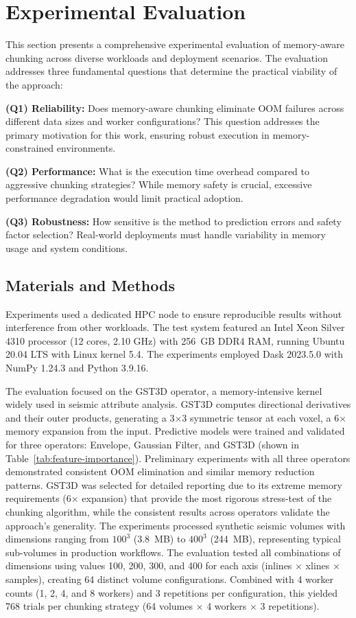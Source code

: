 \section{Experimental Evaluation}
\label{sec:experimental-results}

This section presents a comprehensive experimental evaluation of memory-aware chunking across diverse workloads and deployment scenarios.
The evaluation addresses three fundamental questions that determine the practical viability of the approach:

\textbf{(Q1) Reliability:} Does memory-aware chunking eliminate \ac{OOM} failures across different data sizes and worker configurations?
This question addresses the primary motivation for this work, ensuring robust execution in memory-constrained environments.

\textbf{(Q2) Performance:} What is the execution time overhead compared to aggressive chunking strategies?
While memory safety is crucial, excessive performance degradation would limit practical adoption.

\textbf{(Q3) Robustness:} How sensitive is the method to prediction errors and safety factor selection?
Real-world deployments must handle variability in memory usage and system conditions.

\subsection{Materials and Methods}

Experiments used a dedicated \ac{HPC} node to ensure reproducible results without interference from other workloads.
The test system featured an Intel Xeon Silver 4310 processor (12 cores, 2.10 GHz) with 256~\ac{GB} DDR4 \ac{RAM}, running Ubuntu 20.04 LTS with Linux kernel 5.4.
The experiments employed Dask 2023.5.0 with NumPy 1.24.3 and Python 3.9.16.

The evaluation focused on the \ac{GST3D} operator, a memory-intensive kernel widely used in seismic attribute analysis.
\ac{GST3D} computes directional derivatives and their outer products, generating a 3×3 symmetric tensor at each voxel, a 6× memory expansion from the input.
Predictive models were trained and validated for three operators: Envelope, Gaussian Filter, and \ac{GST3D} (shown in Table~\ref{tab:feature-importance}).
Preliminary experiments with all three operators demonstrated consistent \ac{OOM} elimination and similar memory reduction patterns.
\ac{GST3D} was selected for detailed reporting due to its extreme memory requirements (6× expansion) that provide the most rigorous stress-test of the chunking algorithm, while the consistent results across operators validate the approach's generality.
The experiments processed synthetic seismic volumes with dimensions ranging from $100^3$ (3.8~MB) to $400^3$ (244~MB), representing typical sub-volumes in production workflows.
The evaluation tested all combinations of dimensions using values 100, 200, 300, and 400 for each axis (inlines × xlines × samples), creating 64 distinct volume configurations.
Combined with 4 worker counts (1, 2, 4, and 8 workers) and 3 repetitions per configuration, this yielded 768 trials per chunking strategy (64 volumes × 4 workers × 3 repetitions).

